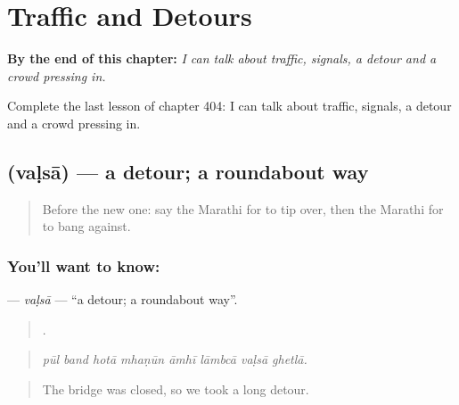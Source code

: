 
\chapter{Traffic and Detours}
\label{ch:mr-traffic-and-detours}

\begin{chapteropening}
\textbf{By the end of this chapter:} \emph{I can talk about traffic, signals, a detour and a crowd pressing in.}

Complete the last lesson of chapter 404: I can talk about traffic, signals, a detour and a crowd pressing in.
\end{chapteropening}

\section[\texorpdfstring{\mr{वळसा} (vaḷsā)}{वळसा (vaḷsā)}]{ (vaḷsā) — a detour; a roundabout way}

\label{lesson:MR-C404-valsa}



\begin{quote}
Before the new one: say the Marathi for to tip over, then the Marathi for to bang against.
\end{quote}

\subsection*{You'll want to know: }
\textbf{} — \emph{vaḷsā} — \textquotedblleft{}a detour; a roundabout way\textquotedblright{}.

\begin{quote}
       .
\end{quote}

\begin{quote}
\emph{pūl band hotā mhaṇūn āmhī lāmbcā vaḷsā ghetlā.}
\end{quote}

\begin{quote}
The bridge was closed, so we took a long detour.
\end{quote}

